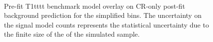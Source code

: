 \begin{figure}[!h]
    \centering
     \\
    \caption{
        Pre-fit T1tttt benchmark model overlay on CR-only post-fit
        background prediction for the simplified bins. The uncertainty on
        the signal model counts represents the statistical uncertainty due
        to the finite size of the of the simulated sample.
    }
    \label{fig:T1tttt_MR_simp}
\end{figure}


